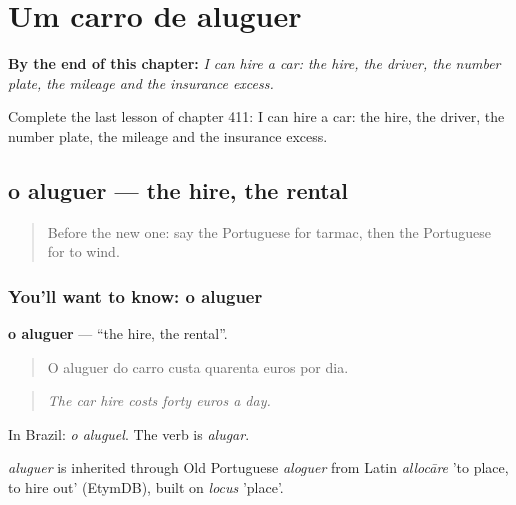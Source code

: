 
\chapter{Um carro de aluguer}
\label{ch:pt-um-carro-de-aluguer}

\begin{chapteropening}
\textbf{By the end of this chapter:} \emph{I can hire a car: the hire, the driver, the number plate, the mileage and the insurance excess.}

Complete the last lesson of chapter 411: I can hire a car: the hire, the driver, the number plate, the mileage and the insurance excess.
\end{chapteropening}

\section[o aluguer]{o aluguer — the hire, the rental}

\label{lesson:PT-C411-aluguer}



\begin{quote}
Before the new one: say the Portuguese for tarmac, then the Portuguese for to wind.
\end{quote}

\subsection*{You'll want to know: o aluguer}
\textbf{o aluguer} — \textquotedblleft{}the hire, the rental\textquotedblright{}.

\begin{quote}
O aluguer do carro custa quarenta euros por dia.
\end{quote}

\begin{quote}
\emph{The car hire costs forty euros a day.}
\end{quote}

In Brazil: \emph{o aluguel}. The verb is \emph{alugar}.

\begin{cousinweb}
\emph{aluguer} is inherited through Old Portuguese \emph{aloguer} from Latin \emph{allocāre} 'to place, to hire out' (EtymDB), built on \emph{locus} 'place'.
\end{cousinweb}

